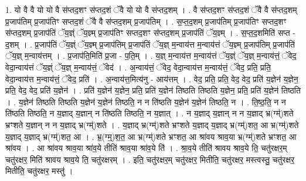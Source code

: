 \documentclass[17pt]{extarticle}
\begin{document}
1. यो वै वै यो यो वै स॑प्तद॒शꣳ स॑प्तद॒शं ॅवै यो यो वै स॑प्तद॒शम् । . वै स॑प्तद॒शꣳ स॑प्तद॒शं ॅवै वै स॑प्तद॒शम् प्र॒जाप॑तिम् प्र॒जाप॑तिꣳ सप्तद॒शं ॅवै वै स॑प्तद॒शम् प्र॒जाप॑तिम् । . स॒प्त॒द॒शम् प्र॒जाप॑तिम् प्र॒जाप॑तिꣳ सप्तद॒शꣳ स॑प्तद॒शम् प्र॒जाप॑तिं ॅय॒ज्ञ्ं ॅय॒ज्ञ्म् प्र॒जाप॑तिꣳ सप्तद॒शꣳ स॑प्तद॒शम् प्र॒जाप॑तिं ॅय॒ज्ञ्म् । . स॒प्त॒द॒शमिति॑ सप्त - द॒शम् । . प्र॒जाप॑तिं ॅय॒ज्ञ्ं ॅय॒ज्ञ्म् प्र॒जाप॑तिम् प्र॒जाप॑तिं ॅय॒ज्ञ् म॒न्वाय॑त्त म॒न्वाय॑त्तं ॅय॒ज्ञ्म् प्र॒जाप॑तिम् प्र॒जाप॑तिं ॅय॒ज्ञ् म॒न्वाय॑त्तम् । . प्र॒जाप॑ति॒मिति॑ प्र॒जा - प॒ति॒म् । . य॒ज्ञ् म॒न्वाय॑त्त म॒न्वाय॑त्तं ॅय॒ज्ञ्ं ॅय॒ज्ञ् म॒न्वाय॑त्तं॒ ॅवेद॒ वेदा॒न्वाय॑त्तं ॅय॒ज्ञ्ं ॅय॒ज्ञ् म॒न्वाय॑त्तं॒ ॅवेद॑ । . अ॒न्वाय॑त्तं॒ ॅवेद॒ वेदा॒न्वाय॑त्त म॒न्वाय॑त्तं॒ ॅवेद॒ प्रति॒ प्रति॒ वेदा॒न्वाय॑त्त म॒न्वाय॑त्तं॒ ॅवेद॒ प्रति॑ । . अ॒न्वाय॑त्त॒मित्य॑नु - आय॑त्तम् । . वेद॒ प्रति॒ प्रति॒ वेद॒ वेद॒ प्रति॑ य॒ज्ञेन॑ य॒ज्ञेन॒ प्रति॒ वेद॒ वेद॒ प्रति॑ य॒ज्ञेन॑ । . प्रति॑ य॒ज्ञेन॑ य॒ज्ञेन॒ प्रति॒ प्रति॑ य॒ज्ञेन॑ तिष्ठति तिष्ठति य॒ज्ञेन॒ प्रति॒ प्रति॑ य॒ज्ञेन॑ तिष्ठति । . य॒ज्ञेन॑ तिष्ठति तिष्ठति य॒ज्ञेन॑ य॒ज्ञेन॑ तिष्ठति॒ न न ति॑ष्ठति य॒ज्ञेन॑ य॒ज्ञेन॑ तिष्ठति॒ न । . ति॒ष्ठ॒ति॒ न न ति॑ष्ठति तिष्ठति॒ न य॒ज्ञाद् य॒ज्ञान् न ति॑ष्ठति तिष्ठति॒ न य॒ज्ञात् । . न य॒ज्ञाद् य॒ज्ञान् न न य॒ज्ञाद् भ्र(ग्म्॑)शते भ्रꣳशते य॒ज्ञान् न न य॒ज्ञाद् भ्र(ग्म्॑)शते । . य॒ज्ञाद् भ्र(ग्म्॑)शते भ्रꣳशते य॒ज्ञाद् य॒ज्ञाद् भ्र(ग्म्॑)शत॒ आ भ्र(ग्म्॑)शते य॒ज्ञाद् य॒ज्ञाद् भ्र(ग्म्॑)शत॒ आ । . भ्र॒(ग्म्॒)श॒त॒ आ भ्र(ग्म्॑)शते भ्रꣳशत॒ आ श्रा॑वय श्राव॒या भ्र(ग्म्॑)शते भ्रꣳशत॒ आ श्रा॑वय । . आ श्रा॑वय श्राव॒या श्रा॑व॒ये तीति॑ श्राव॒या श्रा॑व॒ये ति॑ । . श्रा॒व॒ये तीति॑ श्रावय श्राव॒ये ति॒ चतु॑रक्षर॒म् चतु॑रक्षर॒ मिति॑ श्रावय श्राव॒ये ति॒ चतु॑रक्षरम् । . इति॒ चतु॑रक्षर॒म् चतु॑रक्षर॒ मितीति॒ चतु॑रक्षर॒ मस्त्वस्तु॒ चतु॑रक्षर॒ मितीति॒ चतु॑रक्षर॒ मस्तु॑ । \newline
\end{document}
